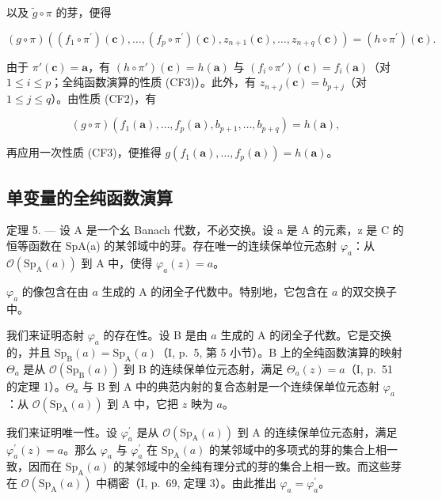 以及 \(\widetilde{g}\circ\pi\) 的芽，便得

\[
(g \circ \pi) \left((f _ {1} \circ \pi^ {\prime}) (\boldsymbol {c}), \dots , (f _ {p} \circ \pi^ {\prime}) (\boldsymbol {c}), z _ {n + 1} (\boldsymbol {c}), \dots , z _ {n + q} (\boldsymbol {c})\right) = (h \circ \pi^ {\prime}) (\boldsymbol {c}).
\]

由于 \(\pi'(\boldsymbol{c}) = \boldsymbol{a}\)，有 \((h \circ \pi')(\boldsymbol{c}) = h(\boldsymbol{a})\) 与 \((f_i \circ \pi')(\boldsymbol{c}) = f_i(\boldsymbol{a})\)（对 \(1 \leqslant i \leqslant p\)；全纯函数演算的性质 (CF3)）。此外，有 \(z_{n+j}(\boldsymbol{c}) = b_{p+j}\)（对 \(1 \leqslant j \leqslant q\)）。由性质 (CF2)，有

\[
(g \circ \pi) (f _ {1} (\boldsymbol {a}), \dots , f _ {p} (\boldsymbol {a}), b _ {p + 1}, \dots , b _ {p + q}) = h (\boldsymbol {a}),
\]

再应用一次性质 (CF3)，便推得 \(g(f_{1}(\boldsymbol{a}), \ldots, f_{p}(\boldsymbol{a})) = h(\boldsymbol{a})\)。

\subsection{单变量的全纯函数演算}

定理 5. --- 设 A 是一个幺 Banach 代数，不必交换。设 a 是 A 的元素，z 是 C 的恒等函数在 SpA(a) 的某邻域中的芽。存在唯一的连续保单位元态射 \(\varphi_{a}\)：从 \(\mathcal{O}(\mathrm{Sp}_{\mathrm{A}}(a))\) 到 A 中，使得 \(\varphi_{a}(z)=a\)。

\(\varphi_{a}\) 的像包含在由 \(a\) 生成的 A 的闭全子代数中。特别地，它包含在 \(a\) 的双交换子中。

我们来证明态射 \(\varphi_{a}\) 的存在性。设 B 是由 \(a\) 生成的 A 的闭全子代数。它是交换的，并且 \(\mathrm{Sp}_{\mathrm{B}}(a) = \mathrm{Sp}_{\mathrm{A}}(a)\)（I, p.~5, 第 5 小节）。B 上的全纯函数演算的映射 \(\Theta_{a}\) 是从 \(\mathcal{O}(\mathrm{Sp}_{\mathrm{B}}(a))\) 到 B 的连续保单位元态射，满足 \(\Theta_{a}(z) = a\)（I, p.~51 的定理 1）。\(\Theta_{a}\) 与 B 到 A 中的典范内射的复合态射是一个连续保单位元态射 \(\varphi_{a}\)：从 \(\mathcal{O}(\mathrm{Sp}_{\mathrm{A}}(a))\) 到 A 中，它把 \(z\) 映为 \(a\)。

我们来证明唯一性。设 \(\varphi_{a}^{\prime}\) 是从 \(\mathcal{O}(\mathrm{Sp}_{\mathrm{A}}(a))\) 到 A 的连续保单位元态射，满足 \(\varphi_{a}^{\prime}(z)=a\)。那么 \(\varphi_{a}\) 与 \(\varphi_{a}^{\prime}\) 在 \(\mathrm{Sp}_{\mathrm{A}}(a)\) 的某邻域中的多项式的芽的集合上相一致，因而在 \(\mathrm{Sp}_{\mathrm{A}}(a)\) 的某邻域中的全纯有理分式的芽的集合上相一致。而这些芽在 \(\mathcal{O}(\mathrm{Sp}_{\mathrm{A}}(a))\) 中稠密（I, p.~69, 定理 3）。由此推出 \(\varphi_{a}=\varphi_{a}^{\prime}\)。

